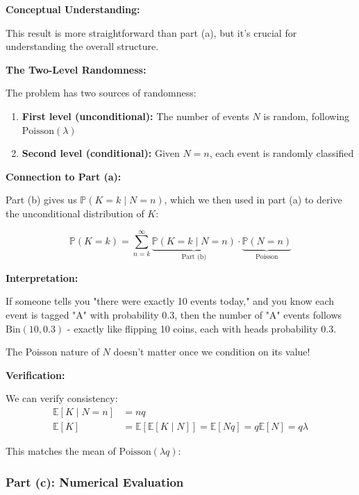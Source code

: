 \documentclass[12pt]{article}
\begin{document}
\begin{explanation}
\textbf{Conceptual Understanding:}

This result is more straightforward than part (a), but it's crucial for understanding the overall structure.

\textbf{The Two-Level Randomness:}

The problem has two sources of randomness:
\begin{enumerate}
    \item \textbf{First level (unconditional):} The number of events \(N\) is random, following \(\text{Poisson}(\lambda)\)

    \item \textbf{Second level (conditional):} Given \(N = n\), each event is randomly classified
\end{enumerate}

\textbf{Connection to Part (a):}

Part (b) gives us \(\mathbb{P}(K = k \mid N = n)\), which we then used in part (a) to derive the unconditional distribution of \(K\):

\[
\mathbb{P}(K = k) = \sum_{n=k}^{\infty} \underbrace{\mathbb{P}(K = k \mid N = n)}_{\text{Part (b)}} \cdot \underbrace{\mathbb{P}(N = n)}_{\text{Poisson}}
\]

\textbf{Interpretation:}

If someone tells you "there were exactly 10 events today," and you know each event is tagged "A" with probability 0.3, then the number of "A" events follows \(\text{Bin}(10, 0.3)\) - exactly like flipping 10 coins, each with heads probability 0.3.

The Poisson nature of \(N\) doesn't matter once we condition on its value!

\textbf{Verification:}

We can verify consistency:
\begin{align*}
\mathbb{E}[K \mid N = n] &= nq \\
\mathbb{E}[K] &= \mathbb{E}[\mathbb{E}[K \mid N]] = \mathbb{E}[Nq] = q\mathbb{E}[N] = q\lambda
\end{align*}

This matches the mean of \(\text{Poisson}(\lambda q)\):
\end{explanation}

\subsubsection{Part (c): Numerical Evaluation}
\end{document}
